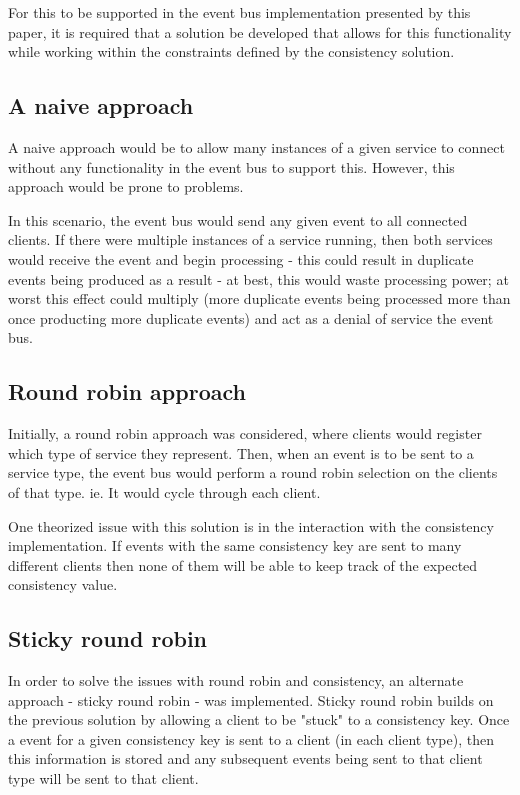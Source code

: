 \documentclass{l3proj}
\begin{document}
For this to be supported in the event bus implementation presented by this paper, it is required that a solution be developed that allows for this functionality while working within the constraints defined by the consistency solution.

\subsection{A naive approach}
A naive approach would be to allow many instances of a given service to connect without any functionality in the event bus to support this. However, this approach would be prone to problems.

In this scenario, the event bus would send any given event to all connected clients. If there were multiple instances of a service running, then both services would receive the event and begin processing - this could result in duplicate events being produced as a result - at best, this would waste processing power; at worst this effect could multiply (more duplicate events being processed more than once producting more duplicate events) and act as a denial of service the event bus.

\subsection{Round robin approach}
Initially, a round robin approach was considered, where clients would register which type of service they represent. Then, when an event is to be sent to a service type, the event bus would perform a round robin selection on the clients of that type. ie. It would cycle through each client.

One theorized issue with this solution is in the interaction with the consistency implementation. If events with the same consistency key are sent to many different clients then none of them will be able to keep track of the expected consistency value.

\subsection{Sticky round robin}
In order to solve the issues with round robin and consistency, an alternate approach - sticky round robin - was implemented. Sticky round robin builds on the previous solution by allowing a client to be "stuck" to a consistency key. Once a event for a given consistency key is sent to a client (in each client type), then this information is stored and any subsequent events being sent to that client type will be sent to that client.
\end{document}
